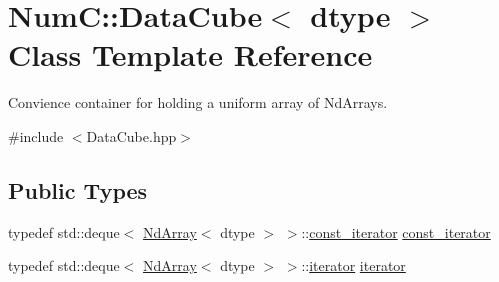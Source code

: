 \hypertarget{class_num_c_1_1_data_cube}{}\section{NumC\+:\+:Data\+Cube$<$ dtype $>$ Class Template Reference}
\label{class_num_c_1_1_data_cube}


Convience container for holding a uniform array of Nd\+Arrays.  




{\ttfamily \#include $<$Data\+Cube.\+hpp$>$}

\subsection*{Public Types}
\begin{DoxyCompactItemize}
\item 
typedef std\+::deque$<$ \mbox{\hyperlink{class_num_c_1_1_nd_array}{Nd\+Array}}$<$ dtype $>$ $>$\+::\mbox{\hyperlink{class_num_c_1_1_data_cube_afb6045a628e0587b3343da1dda12fa03}{const\+\_\+iterator}} \mbox{\hyperlink{class_num_c_1_1_data_cube_afb6045a628e0587b3343da1dda12fa03}{const\+\_\+iterator}}
\item 
typedef std\+::deque$<$ \mbox{\hyperlink{class_num_c_1_1_nd_array}{Nd\+Array}}$<$ dtype $>$ $>$\+::\mbox{\hyperlink{class_num_c_1_1_data_cube_aa3703e7574db61a4e1ef4b8db93db86a}{iterator}} \mbox{\hyperlink{class_num_c_1_1_data_cube_aa3703e7574db61a4e1ef4b8db93db86a}{iterator}}
\end{DoxyCompactItemize}
